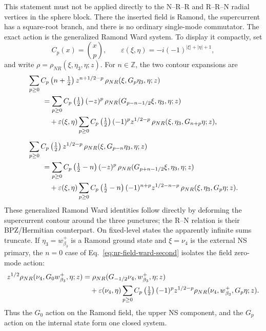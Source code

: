 \documentclass[11pt]{article}
\begin{document}
This statement must not be applied directly to the N--R--R and
R--R--N radial vertices in the sphere block.  There the inserted field
is Ramond, the supercurrent has a square-root branch, and there is no
ordinary single-mode commutator.  The exact action is the generalized
Ramond Ward system.  To display it compactly, set
\[
 C_p(x)=\binom{x}{p},
 \qquad
 \varepsilon(\xi,\eta)=-i(-1)^{|\xi|+|\eta|+1},
\]
and write
\(\rho=\rho_{NR}(\xi,\eta_3,\eta;z)\).  For \(n\in\mathbb Z\), the two
contour expansions are
\begin{align}
 &\sum_{p\geq0}C_p\left(n+\tfrac12\right)
 z^{n+1/2-p}\,
 \rho_{NR}(\xi,G_p\eta_3,\eta;z)
 \notag\\
 &\qquad=
 \sum_{p\geq0}C_p\left(\tfrac12\right)(-z)^p\,
 \rho_{NR}(G_{p-n-1/2}\xi,\eta_3,\eta;z)
 \notag\\
 &\qquad\quad+
 \varepsilon(\xi,\eta)
 \sum_{p\geq0}C_p\left(\tfrac12\right)(-1)^p z^{1/2-p}\,
 \rho_{NR}(\xi,\eta_3,G_{n+p}\eta;z),
 \label{eq:nr-field-ward-first}\\[2mm]
 &\sum_{p\geq0}C_p\left(\tfrac12\right)z^{1/2-p}\,
 \rho_{NR}(\xi,G_{p-n}\eta_3,\eta;z)
 \notag\\
 &\qquad=
 \sum_{p\geq0}C_p\left(\tfrac12-n\right)(-z)^p\,
 \rho_{NR}(G_{p+n-1/2}\xi,\eta_3,\eta;z)
 \notag\\
 &\qquad\quad+
 \varepsilon(\xi,\eta)
 \sum_{p\geq0}C_p\left(\tfrac12-n\right)(-1)^{n+p}
 z^{1/2-n-p}\,
 \rho_{NR}(\xi,\eta_3,G_p\eta;z).
 \label{eq:nr-field-ward-second}
\end{align}
These generalized Ramond Ward identities follow directly by deforming
the supercurrent contour around the three punctures; the R--N relation
is their BPZ/Hermitian counterpart.  On fixed-level states the apparently
infinite sums truncate.  If \(\eta_3=w_{\beta_3}^+\) is a Ramond
ground state and \(\xi=\nu_4\) is the external NS primary, the \(n=0\)
case of Eq.~\eqref{eq:nr-field-ward-second} isolates the field
zero-mode action:
\begin{align}
 z^{1/2}\rho_{NR}(\nu_4,G_0w_{\beta_3}^+,\eta;z)
 &=
 \rho_{NR}(G_{-1/2}\nu_4,w_{\beta_3}^+,\eta;z)
 \notag\\
 &\quad+
 \varepsilon(\nu_4,\eta)
 \sum_{p\geq0}C_p\left(\tfrac12\right)(-1)^p z^{1/2-p}
 \rho_{NR}(\nu_4,w_{\beta_3}^+,G_p\eta;z).
 \label{eq:nr-g0-field-action}
\end{align}
Thus the \(G_0\) action on the Ramond field, the upper NS component,
and the \(G_p\) action on the internal state form one closed system.
\end{document}
